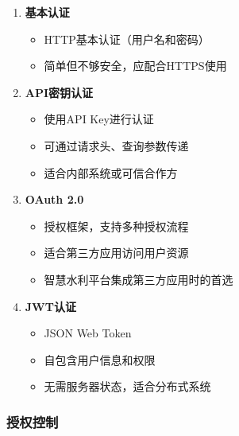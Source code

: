 \begin{enumerate}
\def\labelenumi{\arabic{enumi}.}
\tightlist
\item
  \textbf{基本认证}

  \begin{itemize}
  \tightlist
  \item
    HTTP基本认证（用户名和密码）
  \item
    简单但不够安全，应配合HTTPS使用
  \end{itemize}
\item
  \textbf{API密钥认证}

  \begin{itemize}
  \tightlist
  \item
    使用API Key进行认证
  \item
    可通过请求头、查询参数传递
  \item
    适合内部系统或可信合作方
  \end{itemize}
\item
  \textbf{OAuth 2.0}

  \begin{itemize}
  \tightlist
  \item
    授权框架，支持多种授权流程
  \item
    适合第三方应用访问用户资源
  \item
    智慧水利平台集成第三方应用时的首选
  \end{itemize}
\item
  \textbf{JWT认证}

  \begin{itemize}
  \tightlist
  \item
    JSON Web Token
  \item
    自包含用户信息和权限
  \item
    无需服务器状态，适合分布式系统
  \end{itemize}
\end{enumerate}

\subsubsection{授权控制}\label{ux6388ux6743ux63a7ux5236}

